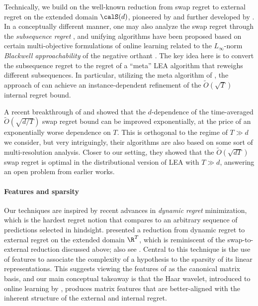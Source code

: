 \documentclass[10pt]{article}
\begin{document}
Technically, we build on the well-known reduction from swap regret to external regret on the extended domain $\calS(d)$, pioneered by \cite{stoltz2005internal,blum2007external,gordon2008no} and further developed by \cite{ito2020tight}. In a conceptually different manner, one may also analyze the swap regret through the \emph{subsequence regret} \citep{lehrer2003wide,roth2023learning}, and unifying algorithms have been proposed based on certain multi-objective formulations of online learning \citep{lee2022online,haghtalab2023calibrated,noarov2023high} related to the $L_\infty$-norm \emph{Blackwell approachability} of the negative orthant \citep{blackwell1956analog,perchet2015exponential,shimkin2016online}. The key idea here is to convert the subsequence regret to the regret of a ``meta'' LEA algorithm that reweighs different subsequences. In particular, utilizing the meta algorithm of \cite{chen2021impossible}, the approach of \cite{roth2023learning} can achieve an instance-dependent refinement of the $\tilde O(\sqrt{T})$ internal regret bound.

A recent breakthrough of \cite{dagan2024external} and \cite{peng2024fast} showed that the $d$-dependence of the time-averaged $\tilde O(\sqrt{d/T})$ swap regret bound can be improved exponentially, at the price of an exponentially worse dependence on $T$. This is orthogonal to the regime of $T\gg d$ we consider, but very intriguingly, their algorithms are also based on some sort of multi-resolution analysis. Closer to our setting, they showed that the $\tilde O(\sqrt{dT})$ swap regret is optimal in the distributional version of LEA with $T\gg d$, answering an open problem from earlier works. 

\paragraph{Features and sparsity} Our techniques are inspired by recent advances in \emph{dynamic regret} minimization, which is the hardest regret notion that compares to an arbitrary sequence of predictions selected in hindsight. \cite{zhang2023unconstrained} presented a reduction from dynamic regret to external regret on the extended domain $\R^T$, which is reminiscent of the swap-to-external reduction discussed above; also see \citep{jacobsen2024equivalence}. Central to this technique is the use of features to associate the complexity of a hypothesis to the sparsity of its linear representations. This suggests viewing the features of \citep{blum2007external} as the canonical matrix basis, and our main conceptual takeaway is that the Haar wavelet, introduced to online learning by \cite{baby2019online}, produces matrix features that are better-aligned with the inherent structure of the external and internal regret. 
\end{document}
